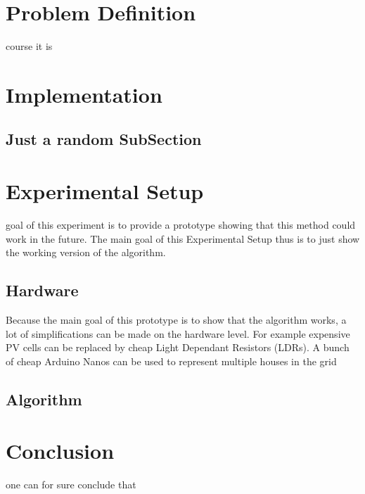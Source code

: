 \documentclass[a4paper,journal]{DDREAM}
\begin{document}
\section{Problem Definition}\label{sec:problem_definition}
 course it is 


\section{Implementation}\label{sec:implementation}

\subsection{Just a random SubSection}\label{sec:implementation-algorithm}


\section{Experimental Setup}\label{sec:experiment}
 goal of this experiment is to provide a prototype showing that this method could work in the future.
The main goal of this Experimental Setup thus is to just show the working version of the algorithm.

\subsection{Hardware}\label{sec:implementation-hardware}
Because the main goal of this prototype is to show that the algorithm works, a lot of simplifications can be made on the hardware level.
For example expensive PV cells can be replaced by cheap Light Dependant Resistors (LDRs).
A bunch of cheap Arduino Nanos can be used to represent multiple houses in the grid

\subsection{Algorithm}\label{sec:implementation-algorithm}




\section{Conclusion}\label{sec:conclusion}
 one can for sure conclude that 

\end{document}
